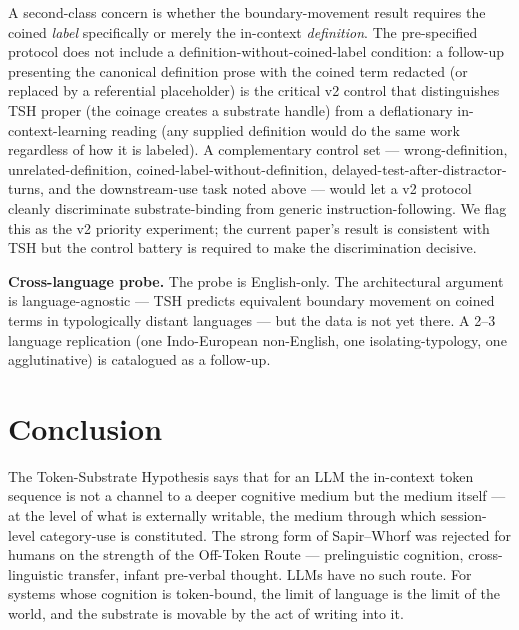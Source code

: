 \documentclass[11pt,a4paper]{article}
\begin{document}
A second-class concern is whether the boundary-movement result requires the coined \textit{label} specifically or merely the in-context \textit{definition}. The pre-specified protocol does not include a definition-without-coined-label condition: a follow-up presenting the canonical definition prose with the coined term redacted (or replaced by a referential placeholder) is the critical v2 control that distinguishes TSH proper (the coinage creates a substrate handle) from a deflationary in-context-learning reading (any supplied definition would do the same work regardless of how it is labeled). A complementary control set --- wrong-definition, unrelated-definition, coined-label-without-definition, delayed-test-after-distractor-turns, and the downstream-use task noted above --- would let a v2 protocol cleanly discriminate substrate-binding from generic instruction-following. We flag this as the v2 priority experiment; the current paper's result is consistent with TSH but the control battery is required to make the discrimination decisive.

\textbf{Cross-language probe.} The probe is English-only. The architectural argument is language-agnostic --- TSH predicts equivalent boundary movement on coined terms in typologically distant languages --- but the data is not yet there. A 2--3 language replication (one Indo-European non-English, one isolating-typology, one agglutinative) is catalogued as a follow-up.

\section{Conclusion}

The Token-Substrate Hypothesis says that for an LLM the in-context token sequence is not a channel to a deeper cognitive medium but the medium itself --- at the level of what is externally writable, the medium through which session-level category-use is constituted. The strong form of Sapir--Whorf was rejected for humans on the strength of the Off-Token Route --- prelinguistic cognition, cross-linguistic transfer, infant pre-verbal thought. LLMs have no such route. For systems whose cognition is token-bound, the limit of language is the limit of the world, and the substrate is movable by the act of writing into it.
\end{document}
